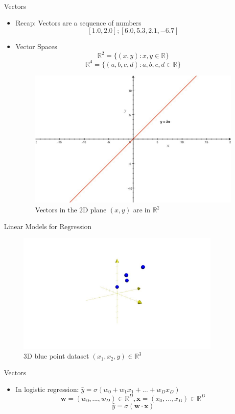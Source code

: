 \begin{frame}{Vectors}
\begin{itemize}
    \item Recap: Vectors are a sequence of numbers
    $$[1.0, 2.0]; [6.0, 5.3, 2.1, -6.7]$$
    \item Vector Spaces
    $$\mathbb{R}^2 = \{(x, y) : x, y \in \mathbb{R}\}$$
    $$\mathbb{R}^4 = \{(a, b, c, d) : a, b, c, d \in \mathbb{R}\}$$
    \begin{figure}
    \centering
    \includegraphics[width=.5\textwidth]{img/line.jpg}
    \caption{Vectors in the 2D plane $(x, y)$ are in $\mathbb{R}^2$}
    \end{figure}
\end{itemize}
\end{frame}

\begin{frame}{Linear Models for Regression}
\begin{figure}
    \centering
    \includegraphics[width=0.9\textwidth]{img/3d_regressed_points.jpg}
    \caption{3D blue point dataset $(x_1, x_2, y) \in \mathbb{R}^3$}
\end{figure}
\end{frame}

\begin{frame}{Vectors}
\begin{itemize}
    \item In logistic regression: $\hat{y} = \sigma(w_0 + w_1x_1 + ... + w_Dx_D)$
    $$\textbf{w} = (w_0, ..., w_D) \in \mathbb{R}^D, \textbf{x} = (x_0, ..., x_D) \in \mathbb{R}^D$$
    $$\hat{y} = \sigma(\textbf{w} \cdot \textbf{x})$$
\end{itemize}
\end{frame}

